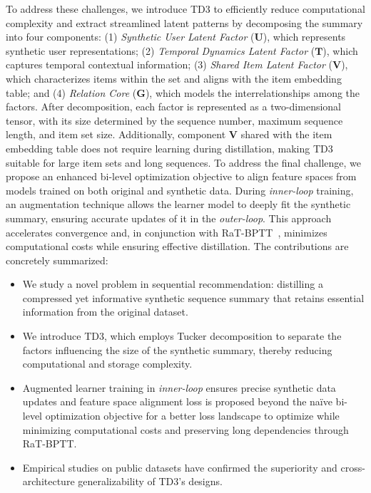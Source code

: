 To address these challenges, we introduce TD3
to efficiently reduce computational complexity and extract streamlined latent patterns by decomposing the summary into four components: (1) \textit{Synthetic User Latent Factor} ($\mathbf{U}$), which represents synthetic user representations; (2) \textit{Temporal Dynamics Latent Factor} ($\mathbf{T}$), which captures temporal contextual information; (3) \textit{Shared Item Latent Factor} ($\mathbf{V}$), which characterizes items within the set and aligns with the item embedding table; and (4) \textit{Relation Core} ($\mathbf{G}$), which models the interrelationships among the factors. After decomposition, each factor is represented as a two-dimensional tensor, with its size determined by the sequence number, maximum sequence length, and item set size. Additionally, component $\mathbf{V}$ shared with the item embedding table does not require learning during distillation, making TD3 suitable for large item sets and long sequences. To address the final challenge, we propose an enhanced bi-level optimization objective to align feature spaces from models trained on both original and synthetic data. During \emph{inner-loop} training, an augmentation technique allows the learner model to deeply fit the synthetic summary, ensuring accurate updates of it in the \emph{outer-loop}. This approach accelerates convergence and, in conjunction with RaT-BPTT~\cite{feng2023embarrassingly}, minimizes computational costs while ensuring effective distillation. The contributions are concretely summarized:

\vspace{-1pt}
\begin{itemize}[topsep=4pt, itemsep=2pt, leftmargin=0.5cm]
    \item We study a novel problem in sequential recommendation: distilling a compressed yet informative synthetic sequence summary that retains essential information from the original dataset.
    \item We introduce TD3, which employs Tucker decomposition to separate the factors influencing the size of the synthetic summary, thereby reducing computational and storage complexity.
    \item Augmented learner training in \emph{inner-loop} ensures precise synthetic data updates and feature space alignment loss is proposed beyond the na\"ive bi-level optimization objective for a better loss landscape to optimize while minimizing computational costs and preserving long dependencies through RaT-BPTT.
    \item Empirical studies on public datasets have confirmed the superiority and cross-architecture generalizability of TD3's designs.
\end{itemize}
